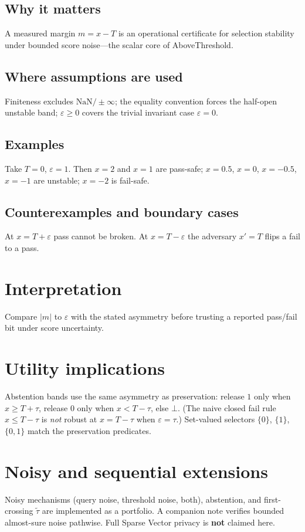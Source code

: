 \documentclass[11pt]{article}
\begin{document}
\subsection{Why it matters}
A measured margin \(m=x-T\) is an operational certificate for selection
stability under bounded score noise---the scalar core of AboveThreshold.

\subsection{Where assumptions are used}
Finiteness excludes \(\mathrm{NaN}/\pm\infty\); the equality convention forces
the half-open unstable band; \(\varepsilon\ge 0\) covers the trivial invariant case
\(\varepsilon=0\).

\subsection{Examples}
Take \(T=0\), \(\varepsilon=1\). Then \(x=2\) and \(x=1\) are pass-safe;
\(x=0.5\), \(x=0\), \(x=-0.5\), \(x=-1\) are unstable; \(x=-2\) is fail-safe.

\subsection{Counterexamples and boundary cases}
At \(x=T+\varepsilon\) pass cannot be broken.
At \(x=T-\varepsilon\) the adversary \(x'=T\) flips a fail to a pass.

\section{Interpretation}
Compare \(\lvert m\rvert\) to \(\varepsilon\) with the stated asymmetry before
trusting a reported pass/fail bit under score uncertainty.

\section{Utility implications}
Abstention bands use the same asymmetry as preservation: release \(1\) only when
\(x\ge T+\tau\), release \(0\) only when \(x<T-\tau\), else \(\bot\).
(The naive closed fail rule \(x\le T-\tau\) is \emph{not} robust at \(x=T-\tau\) when
\(\varepsilon=\tau\).) Set-valued selectors \(\{0\}\), \(\{1\}\), \(\{0,1\}\) match
the preservation predicates.

\section{Noisy and sequential extensions}
Noisy mechanisms (query noise, threshold noise, both), abstention, and
first-crossing \(\widetilde\tau\) are implemented as a portfolio.
A companion note verifies bounded almost-sure noise pathwise.
Full Sparse Vector privacy is \textbf{not} claimed here.
\end{document}
